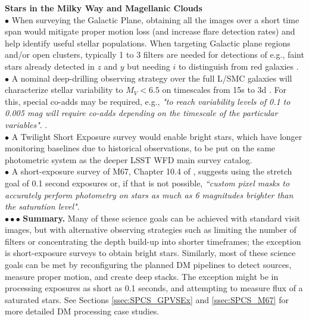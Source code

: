 \documentclass[DM,lsstdraft,toc]{lsstdoc}
\begin{document}
\noindent \textbf{Stars in the Milky Way and Magellanic Clouds} \\
$\bullet$ When surveying the Galactic Plane, obtaining all the images over a short time span would mitigate proper motion loss (and increase flare detection rates) and help identify useful stellar populations. When targeting Galactic plane regions and/or open clusters, typically 1 to 3 filters are needed for detections of e.g., faint stars already detected in $z$ and $y$ but needing $i$ to distinguish from red galaxies \cite{DhitalWP}. \\
$\bullet$ A nominal deep-drilling observing strategy over the full L/SMC galaxies will characterize stellar variability to $M_V<6.5$ on timescales from 15s to 3d \cite{SzkodyWP}. For this, special co-adds may be required, e.g., {\it "to reach variability levels of 0.1 to 0.005 mag will require co-adds depending on the timescale of the particular variables"}. \citep{SzkodyWP}. \\
$\bullet$ A Twilight Short Exposure survey would enable bright stars, which have longer monitoring baselines due to historical observations, to be put on the same photometric system as the deeper LSST WFD main survey catalog. \\
$\bullet$ A short-exposure survey of M67, Chapter 10.4 of \cite{2017arXiv170804058L}, suggests using the stretch goal of 0.1 second exposures or, if that is not possible, {\it ``custom pixel masks to accurately perform photometry on stars as much as 6 magnitudes brighter than the saturation level"}. \\
$\bullet \bullet \bullet$ {\bf Summary.} Many of these science goals can be achieved with standard visit images, but with alternative observing strategies such as limiting the number of filters or concentrating the depth build-up into shorter timeframes; the exception is short-exposure surveys to obtain bright stars. Similarly, most of these science goals can be met by reconfiguring the planned DM pipelines to detect sources, measure proper motion, and create deep stacks. The exception might be in processing exposures as short as 0.1 seconds, and attempting to measure flux of a saturated stars. See Sections \ref{ssec:SPCS_GPVSEx} and \ref{ssec:SPCS_M67} for more detailed DM processing case studies.
\end{document}
